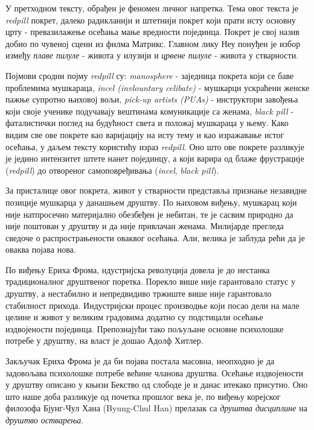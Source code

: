 \documentclass[b5paper]{article}
\begin{document}
\large

У претходном тексту, обрађен је феномен личног напретка. Тема овог текста је \textit{redpill} покрет, далеко радикланији и штетнији покрет који прати исту основну црту - превазилажење осећања мање вредности појединца. Покрет је свој назив добио по чувеној сцени из филма Матрикс. Главном лику Неу понуђен је избор између \textit{плаве пилуле} - живота у илузији и \textit{црвене пилуле} - живота у стварности.

Појмови сродни појму \textit{redpill} су: \textit{manosphere} - заједница покрета који се баве проблемима мушкараца, \textit{incel (invlountary celibate)} - мушкарци ускраћени женске пажње супротно њиховој вољи, \textit{pick-up artists (PUAs)} - инструктори завођења који своје ученике подучавају вештинама комуникације са женама, \textit{black pill} - фаталистички поглед на будућност света и положај мушкараца у њему. Како видим све ове покрете као варијацију на исту тему и као изражавање истог осећања, у даљем тексту користићу израз \textit{redpill}. Оно што ове покрете разликује је једино интензитет штете нанет појединцу, а који варира од блаже фрустрације (\textit{redpill}) до отвореног самоповређивања (\textit{incel}, \textit{black pill}).

За присталице овог покрета, живот у стварности представља признање незавидне позиције мушкарца у данашњем друштву. По њиховом виђењу, мушкарац који није натпросечно материјално обезбеђен је небитан, те је сасвим природно да није поштован у друштву и да није привлачан женама. Милијарде прегледа сведоче о распрострањености оваквог осећања. Али, велика је заблуда рећи да је оваква појава нова.

По виђењу Ериха Фрома, ндустријска револуција довела је до нестанка традиционалног друштвеног поретка. Порекло више није гарантовало статус у друштву, а нестабилно и непредвидиво тржиште више није гарантовало стабилност прихода. Индустријски процес производње који посао дели на мале целине и живот у великим градовима додатно су подстицали осећање издвојености појединца. Препознајући тако пољуљане основне психолошке потребе у друштву, на власт је дошао Адолф Хитлер.

Закључак Ериха Фрома је да би појава постала масовна, неопходно је да задовољава психолошке потребе већине чланова друштва. Осећање издвојености у друштву описано у књизи Бекство од слободе је и данас итекако присутно. Оно што наше доба разликује од почетка прошлог века је, по виђењу корејског филозофа Бјунг-Чул Хана (Byung-Chul Han) прелазак са \textit{друштва дисциплине} на \textit{друштво остварења}.
\end{document}
